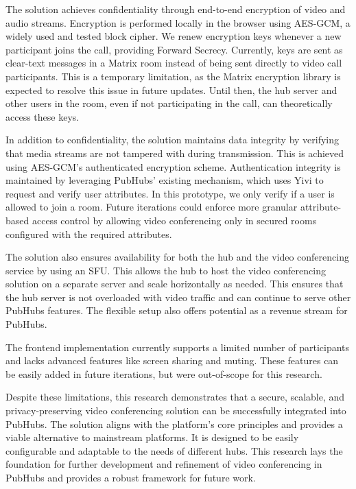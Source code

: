 \documentclass{report}
\begin{document}
The solution achieves confidentiality through end-to-end encryption of video and audio streams. Encryption is
performed locally in the browser using AES-GCM, a widely used and tested block cipher. We renew encryption keys
whenever a new participant joins the call, providing Forward Secrecy. Currently, keys are sent as clear-text
messages in a Matrix room instead of being sent directly to video call participants. This is a temporary
limitation, as the Matrix encryption library is expected to resolve this issue in future updates. Until then, the
hub server and other users in the room, even if not participating in the call, can theoretically access these keys.

In addition to confidentiality, the solution maintains data integrity by verifying that media streams are not
tampered with during transmission. This is achieved using AES-GCM’s authenticated encryption scheme. Authentication
integrity is maintained by leveraging PubHubs’ existing mechanism, which uses Yivi to request and verify user
attributes. In this prototype, we only verify if a user is allowed to join a room. Future iterations could enforce
more granular attribute-based access control by allowing video conferencing only in secured rooms configured with
the required attributes.

The solution also ensures availability for both the hub and the video conferencing service by using an SFU. This
allows the hub to host the video conferencing solution on a separate server and scale horizontally as needed. This
ensures that the hub server is not overloaded with video traffic and can continue to serve other PubHubs features.
The flexible setup also offers potential as a revenue stream for PubHubs.

The frontend implementation currently supports a limited number of participants and lacks advanced features like
screen sharing and muting. These features can be easily added in future iterations, but were out-of-scope for this
research.

Despite these limitations, this research demonstrates that a secure, scalable, and privacy-preserving video
conferencing solution can be successfully integrated into PubHubs. The solution aligns with the platform’s core
principles and provides a viable alternative to mainstream platforms. It is designed to be easily configurable and
adaptable to the needs of different hubs. This research lays the foundation for further development and refinement
of video conferencing in PubHubs and provides a robust framework for future work.
\end{document}
